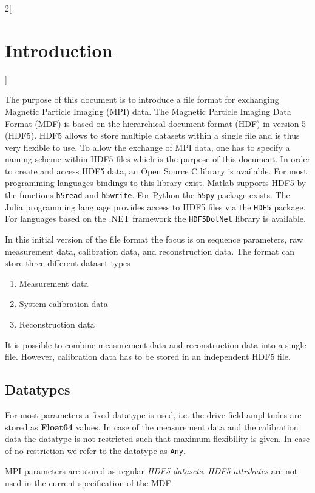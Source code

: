\documentclass[landscape]{article} %
\newcommand{\inl}[1]{\lstinline[columns=fixed]{#1}}
\newcommand{\inltab}[1]{{\ttfamily\bfseries\color{blue}#1}}
\begin{document}
\begin{multicols}{2}[\section{Introduction} \label{Sec:Introduction}]

The purpose of this document is to introduce a file format for exchanging Magnetic Particle Imaging (MPI) data. The Magnetic Particle Imaging Data Format (MDF) is based on the hierarchical document format (HDF) in version 5 (HDF5). HDF5 allows to store multiple datasets within a single file and is thus very flexible to use. To allow the exchange of MPI data, one has to specify a naming scheme within HDF5 files which is the purpose of this document. In order to create and access HDF5 data, an Open Source C library is available. For most programming languages bindings to this library exist. Matlab supports HDF5 by the functions \inl{h5read} and \inl{h5write}. For Python the \inl{h5py} package exists. The Julia programming language provides access to HDF5 files via the \inl{HDF5} package. For languages based on the .NET framework the \inl{HDF5DotNet} library is available.

In this initial version of the file format the focus is on sequence parameters, raw measurement data, calibration data, and reconstruction data. The format can store three different dataset types
\begin{enumerate}
\setlength{\itemsep}{0pt}
\item Measurement data
\item System calibration data
\item Reconstruction data
\end{enumerate}
It is possible to combine measurement data and reconstruction data into a single file. However, calibration data has to be stored in an independent HDF5 file.

\subsection{Datatypes}

For most parameters a fixed datatype is used, i.e. the drive-field amplitudes are stored as \inltab{Float64} values. In case of the measurement data and the calibration data the datatype is not restricted such that maximum flexibility is given. In case of no restriction we refer to the datatype as \inl{Any}.

MPI parameters are stored as regular \textit{HDF5 datasets}. \textit{HDF5 attributes} are not used in the current specification of the MDF.


\end{multicols}
\end{document}

